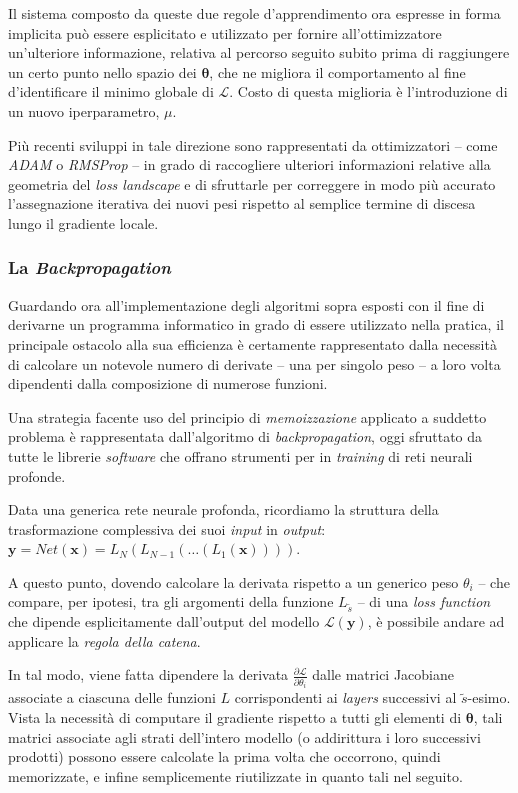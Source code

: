 \documentclass[a4paper, twoside]{article}
\begin{document}
Il sistema composto da queste due regole d'apprendimento ora espresse in forma implicita può essere esplicitato e utilizzato per fornire all'ottimizzatore un'ulteriore informazione, relativa al percorso seguito subito prima di raggiungere un certo punto nello spazio dei $\boldsymbol{\theta}$, che ne migliora il comportamento al fine d'identificare il minimo globale di $\mathcal{L}$. Costo di questa miglioria è l'introduzione di un nuovo iperparametro, $\mu$.


Più recenti sviluppi in tale direzione sono rappresentati da ottimizzatori -- come \textit{ADAM} o \textit{RMSProp} -- in grado di raccogliere ulteriori informazioni relative alla geometria del \textit{loss landscape} e di sfruttarle per correggere in modo più accurato l'assegnazione iterativa dei nuovi pesi rispetto al semplice termine di discesa lungo il gradiente locale.


\subsubsection{La \textit{Backpropagation}}

Guardando ora all'implementazione degli algoritmi sopra esposti con il fine di derivarne un programma informatico in grado di essere utilizzato nella pratica, il principale ostacolo alla sua efficienza è certamente rappresentato dalla necessità di calcolare un notevole numero di derivate -- una per singolo peso -- a loro volta dipendenti dalla composizione di numerose funzioni.

Una strategia facente uso del principio di \textit{memoizzazione} applicato a suddetto problema è rappresentata dall'algoritmo di \textit{backpropagation}, oggi sfruttato da tutte le librerie \textit{software} che offrano strumenti per in \textit{training} di reti neurali profonde.

Data una generica rete neurale profonda, ricordiamo la struttura della trasformazione complessiva dei suoi \textit{input} in \textit{output}: $\boldsymbol{y} = Net(\boldsymbol{x}) = L_N( L_{N-1}(\dots (L_1(\boldsymbol{x}))) )$.

A questo punto, dovendo calcolare la derivata rispetto a un generico peso $\theta_i$ -- che compare, per ipotesi, tra gli argomenti della funzione $L_{\tilde{s}}$ --  di una \textit{loss function} che dipende esplicitamente dall'output del modello $\mathcal{L}(\boldsymbol{y})$, è possibile andare ad applicare la \textit{regola della catena}.

In tal modo, viene fatta dipendere la derivata $\frac{\partial \mathcal{L}}{\partial \theta_i}$ dalle matrici Jacobiane associate a ciascuna delle funzioni $L$ corrispondenti ai \textit{layers} successivi al $\tilde{s}$-esimo. Vista la necessità di computare il gradiente rispetto a tutti gli elementi di $\boldsymbol{\theta}$, tali matrici associate agli strati dell'intero modello (o addirittura i loro successivi prodotti) possono essere calcolate la prima volta che occorrono, quindi memorizzate, e infine semplicemente riutilizzate in quanto tali nel seguito.
\end{document}
